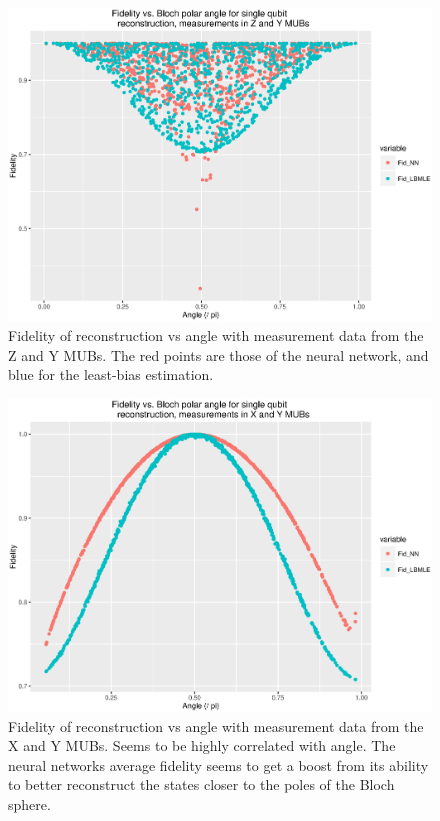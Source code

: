 \documentclass[a4paper,10pt]{article}
\begin{document}
 
 \begin{figure}[h]
  \includegraphics[scale=0.6]{fid_v_angle_zy}
  \caption{Fidelity of reconstruction vs angle with measurement data from the Z and Y MUBs. The red points are those of the neural network, and blue for the least-bias estimation.}
  \label{fig:fid_v_angle_zy}
 \end{figure}
 
  \begin{figure}[h]
  \includegraphics[scale=0.6]{fid_v_angle_xy}
  \caption{Fidelity of reconstruction vs angle with measurement data from the X and Y MUBs. Seems to be highly correlated with angle. The neural networks average fidelity seems to get a boost from its ability to better reconstruct the states closer to the poles of the Bloch sphere.}
  \label{fig:fid_v_angle_xy}
 \end{figure}
 
\end{document}
